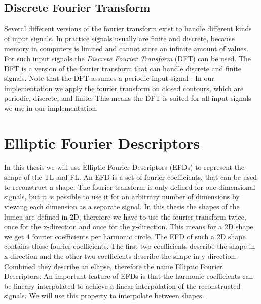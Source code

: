 \documentclass[thesis.tex]{subfiles}
\begin{document}
\subsection{Discrete Fourier Transform}
Several different versions of the fourier transform exist to handle different kinds of input signals. In practice signals usually are finite and discrete, because memory in computers is limited and cannot store an infinite amount of values. For such input signals the \textit{Discrete Fourier Transform} (DFT) can be used. The DFT is a version of the fourier transform that can handle discrete and finite signals. Note that the DFT assumes a periodic input signal \cite{dspguide}. In our implementation we apply the fourier transform on closed contours, which are periodic, discrete, and finite. This means the DFT is suited for all input signals we use in our implementation.




\section{Elliptic Fourier Descriptors}
In this thesis we will use Elliptic Fourier Descriptors (EFDs) to represent the shape of the TL and FL. An EFD is a set of fourier coefficients, that can be used to reconstruct a shape. The fourier transform is only defined for one-dimensional signals, but it is possible to use it for an arbitrary number of dimensions by viewing each dimension as a separate signal. In this thesis the shapes of the lumen are defined in 2D, therefore we have to use the fourier transform twice, once for the x-direction and once for the y-direction. This means for a 2D shape we get 4 fourier coefficients per harmonic circle. The EFD of such a 2D shape contains those fourier coefficients. The first two coefficients describe the shape in x-direction and the other two coefficients describe the shape in y-direction. Combined they describe an ellipse, therefore the name Elliptic Fourier Descriptors. An important feature of EFDs is that the harmonic coefficients can be lineary interpolated to achieve a linear interpolation of the reconstructed signals. We will use this property to interpolate between shapes. 
\end{document}
